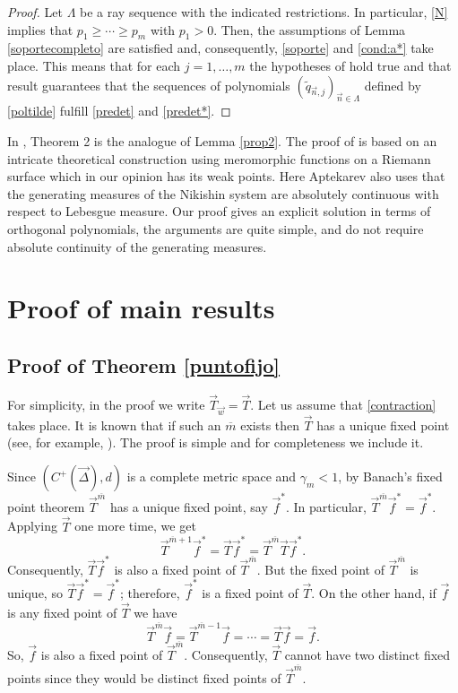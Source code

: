 \documentclass{amsart}
\numberwithin{equation}{section}
\theoremstyle{definition}
\newcommand{\n}{\vec{n}}          %
\begin{document}
\begin{proof} Let $\Lambda$ be a ray sequence with the indicated restrictions. In particular, \eqref{N} implies that
$p_1\geq \cdots \geq p_m$ with $p_1 > 0$. Then, the assumptions of Lemma \ref{soportecompleto} are satisfied and, consequently, \eqref{soporte} and \eqref{cond:a*} take place. This means that for each $j=1,\ldots,m$ the hypotheses  of \cite[Theorem 1.3]{LGLago} hold true and that result guarantees that the sequences of polynomials  $(\tilde{q}_{\n,j})_{\n \in \Lambda}$ defined by \eqref{poltilde} fulfill \eqref{predet} and \eqref{predet*}. \end{proof}

In \cite{sasha99}, Theorem 2 is the analogue of Lemma \ref{prop2}. The proof of  \cite[Theorem 2]{sasha99} is based on an intricate theoretical construction using meromorphic functions on a Riemann surface which in our opinion has its weak points. Here Aptekarev also uses that the generating measures of the Nikishin system are absolutely continuous with respect to Lebesgue measure. Our proof gives an explicit solution in terms of orthogonal polynomials, the arguments are quite simple, and do not require absolute continuity of the generating measures.


\section{Proof of main results}

\subsection{Proof of Theorem \ref{puntofijo}}
For simplicity, in the proof we write $\vec{T}_{\vec{w}} = \vec{T}$. Let us assume that \eqref{contraction} takes place. It is known that if such an $\overline{m}$ exists then  $\vec{T}$ has a unique fixed point (see, for example,  \cite[Ex. (A.1), pg. 17]{GG}). The proof is simple and for completeness we include it.


 Since $( {C}^+ (\vec{\Delta}),d)$ is a complete metric space and $\gamma_m < 1$, by Banach's fixed point theorem    $\vec{T}^{\overline{m}}$ has a unique fixed point, say $\vec{f}^*$. In particular, $\vec{T}^{\overline{m}}\vec{f}^* = \vec{f}^*$. Applying $\vec{T}$ one more time, we get
 \[ \vec{T}^{\overline{m}+1}\vec{f}^* = \vec{T}\vec{f}^* = \vec{T}^{\overline{m} } \vec{T}\vec{f}^*.
 \]
 Consequently, $\vec{T}\vec{f}^*$ is also a fixed point of $\vec{T}^{\overline{m}}$. But the fixed point of $\vec{T}^{\overline{m}}$ is unique, so $\vec{T}\vec{f}^* = \vec{f}^*$; therefore, $\vec{f}^*$ is a fixed point of $\vec{T}$. On the other hand, if $\vec{f}$ is any fixed point of $\vec{T}$ we have
 \[ \vec{T}^{\overline{m}}\vec{f} = \vec{T}^{\overline{m}-1}\vec{f} = \cdots = \vec{T}\vec{f} = \vec{f}.
 \]
 So, $ \vec{f}$ is also a fixed point of $\vec{T}^{\overline{m}}$. Consequently, $ \vec{T}$ cannot have two distinct fixed points since they would be distinct fixed points of $\vec{T}^{\overline{m}}$.
\end{document}
